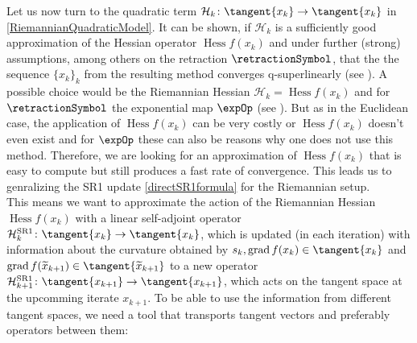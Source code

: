 Let us now turn to the quadratic term $\mathcal{H}_k \colon \tangent{x_k} \to \tangent{x_k}$ in \cref{RiemannianQuadraticModel}. It can be shown, if $\mathcal{H}_k$ is a sufficiently good approximation of the Hessian operator $\operatorname{Hess} f(x_k)$ and under further (strong) assumptions, among others on the retraction $\retractionSymbol$, that the the sequence $\{ x_k \}_k$ from the resulting method converges q-superlinearly (see \cite[Theorem~7.4.11]{AbsilMahonySepulchre:2008}). A possible choice would be the Riemannian Hessian $\mathcal{H}_k = \operatorname{Hess} f(x_k)$ and for $\retractionSymbol$ the exponential map $\expOp$ (see \cite[p.~102]{AbsilMahonySepulchre:2008}). But as in the Euclidean case, the application of $\operatorname{Hess} f(x_k)$ can be very costly or $\operatorname{Hess} f(x_k)$ doesn't even exist and for $\expOp$ these can also be reasons why one does not use this method. Therefore, we are looking for an approximation of $\operatorname{Hess} f(x_k)$ that is easy to compute but still produces a fast rate of convergence. This leads us to genralizing the SR1 update \cref{directSR1formula} for the Riemannian setup. \\
This means we want to approximate the action of the Riemannian Hessian $\operatorname{Hess} f(x_k)$ with a linear self-adjoint operator $\mathcal{H}^\mathrm{SR1}_k \colon \tangent{x_k} \to \tangent{x_k}$, which is updated (in each iteration) with information about the curvature obtained by $s_k, \operatorname{grad} f(x_k) \in \tangent{x_k}$ and $\operatorname{grad} f(\widetilde{x}_{k+1}) \in \tangent{\widetilde{x}_{k+1}}$ to a new operator $\mathcal{H}^\mathrm{SR1}_{k+1} \colon \tangent{x_{k+1}} \to \tangent{x_{k+1}}$, which acts on the tangent space at the upcomming iterate $x_{k+1}$. To be able to use the information from different tangent spaces, we need a tool that transports tangent vectors and preferably operators between them:
